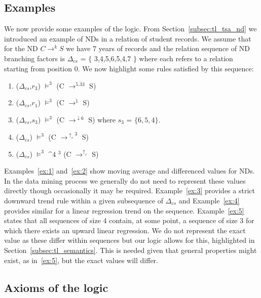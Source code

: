 \subsection{Examples}

We now provide some examples of the logic. From
Section~\ref{subsec:tl_tsa_nd} we introduced an example of NDs in a relation
of student records. We assume that for the ND $C \to^k S$ we have 7
years of records and the relation sequence of ND branching factors is
$\Delta_{cs}$ = $\{$ 3,4,5,6,5,4,7 $\}$ where each refers to a
relation starting from 
position 0. We now highlight some rules satisfied by this sequence:

\begin{enumerate}
\item\label{ex:1} ($\Delta_{cs}$,$r_3$) $\models^3$ (C $\to^{\bar{5.33}}$ S)
\item\label{ex:2} ($\Delta_{cs}$,$r_1$) $\models^3$ (C $\to^{\ddot{1}}$ S)
\item\label{ex:3} ($\Delta_{cs}$,$s_3$) $\models^3$ (C
$\to^{\downarrow{6}}$ S) where $s_3$ = $\{ 6,5,4 \}$.
\item\label{ex:4} ($\Delta_{cs}$) $\models^3$ (C $\to^{\uparrow_r{3}}$ S)
\item\label{ex:5} ($\Delta_{cs}$) $\models^3$ $\bm^4$ \diam$^3$ (C
$\to^{\uparrow_r}$ S)
\end{enumerate}

Examples~\ref{ex:1} and~\ref{ex:2} show moving average and differenced
values for NDs. In the data mining process we generally do not need to
represent these values directly though occasionally it may be
required. Example~\ref{ex:3} provides a strict downward trend rule
within a given subsequence of $\Delta_{cs}$ and Example~\ref{ex:4}
provides similar for a linear regression trend on the
sequence. Example~\ref{ex:5} states that all sequences of size 4
contain, at some point, a sequence of size 3 for which there exists an
upward linear regression. We do not represent the exact value as these
differ within sequences but our logic allows for this, highlighted in Section~\ref{subsec:tl_semantics}. This is needed
given that general properties might 
exist, as in~\ref{ex:5}, but the exact values will differ.

\subsection{Axioms of the logic}\label{subsec:tl_axioms}

